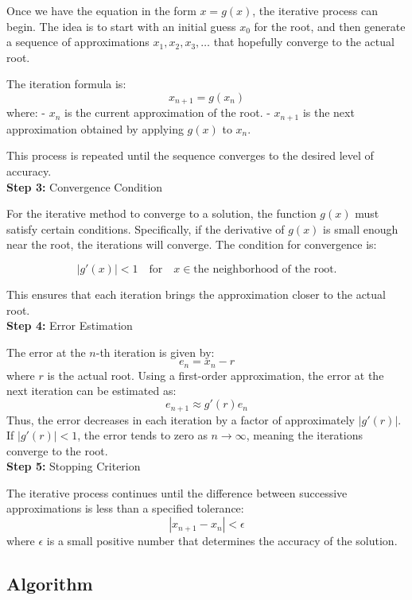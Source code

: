 \documentclass[12pt,a4paper]{article}
\begin{document}
	Once we have the equation in the form \( x = g(x) \), the iterative process can begin. The idea is to start with an initial guess \( x_0 \) for the root, and then generate a sequence of approximations \( x_1, x_2, x_3, \dots \) that hopefully converge to the actual root.
	
	The iteration formula is:
	\[
	x_{n+1} = g(x_n)
	\]
	where:
	- \( x_n \) is the current approximation of the root.
	- \( x_{n+1} \) is the next approximation obtained by applying \( g(x) \) to \( x_n \).
	
	This process is repeated until the sequence converges to the desired level of accuracy.\\
	
	\textbf{Step 3:} Convergence Condition
	
	For the iterative method to converge to a solution, the function \( g(x) \) must satisfy certain conditions. Specifically, if the derivative of \( g(x) \) is small enough near the root, the iterations will converge. The condition for convergence is:
	
	\[
	|g'(x)| < 1 \quad \text{for} \quad x \in \text{the neighborhood of the root}.
	\]
	
	This ensures that each iteration brings the approximation closer to the actual root.\\
	
	\textbf{Step 4:} Error Estimation
	
	The error at the \(n\)-th iteration is given by:
	\[
	e_n = x_n - r
	\]
	where \( r \) is the actual root. Using a first-order approximation, the error at the next iteration can be estimated as:
	\[
	e_{n+1} \approx g'(r) e_n
	\]
	Thus, the error decreases in each iteration by a factor of approximately \( |g'(r)| \). If \( |g'(r)| < 1 \), the error tends to zero as \( n \to \infty \), meaning the iterations converge to the root.\\
	
	\textbf{Step 5:} Stopping Criterion
	
	The iterative process continues until the difference between successive approximations is less than a specified tolerance:
	\[
	|x_{n+1} - x_n| < \epsilon
	\]
	where \( \epsilon \) is a small positive number that determines the accuracy of the solution.
	



	
	\subsection{Algorithm}
	
\end{document}
